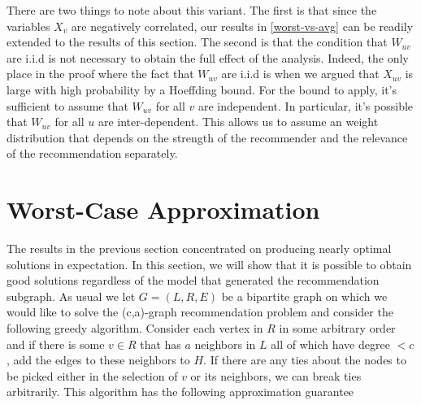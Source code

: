 \documentclass[11pt]{article}
\begin{document}
There are two things to note about this variant. The first is that
since the variables $X_v$ are negatively correlated, our results in
\ref{worst-vs-avg} can be readily extended to the results of this
section. The second is that the condition that $W_{uv}$ are i.i.d
is not necessary to obtain the full effect of the analysis. Indeed,
the only place in the proof where the fact that $W_{uv}$ are i.i.d
is when we argued that $X_{uv}$ is large with high probability by a
Hoeffding bound. For the bound to apply, it's sufficient to assume
that $W_{uv}$ for all $v$ are independent. In particular, it's 
possible that $W_{uv}$ for all $u$ are inter-dependent. This allows
us to assume an weight distribution that depends on the strength of 
the recommender and the relevance of the recommendation separately.


\section{Worst-Case Approximation}
The results in the previous section concentrated on producing nearly
optimal solutions in expectation. In this section, we will show that
it is possible to obtain good solutions regardless of the model that
generated the recommendation subgraph. As usual we let $G=(L,R,E)$ be a
bipartite graph on which we would like to solve the (c,a)-graph
recommendation problem and consider the following greedy
algorithm. Consider each vertex in $R$ in some arbitrary order and if
there is some $v \in R$ that has $a$ neighbors in $L$ all of which
have degree $< c$, add the edges to these neighbors to $H$. If there
are any ties about the nodes to be picked either in the selection of
$v$ or its neighbors, we can break ties arbitrarily. This algorithm
has the following approximation guarantee
\end{document}
